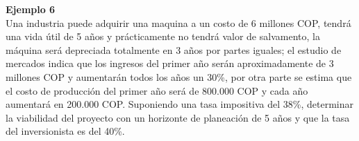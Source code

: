 \textbf{Ejemplo 6}\\
Una industria puede adquirir una maquina a un costo de 6 millones COP, tendrá una vida útil de 5 años y prácticamente no tendrá valor de salvamento, la máquina será depreciada totalmente en 3 años por partes iguales; el estudio de mercados indica que los ingresos del primer año serán aproximadamente de 3 millones COP y aumentarán todos los años un 30\%, por otra parte se estima que el costo de producción del primer año será de 800.000 COP y cada año aumentará en 200.000 COP. Suponiendo una tasa impositiva del 38\%, determinar la viabilidad del proyecto con un horizonte de planeación de 5 años y que la tasa del inversionista es del 40\%.\\



